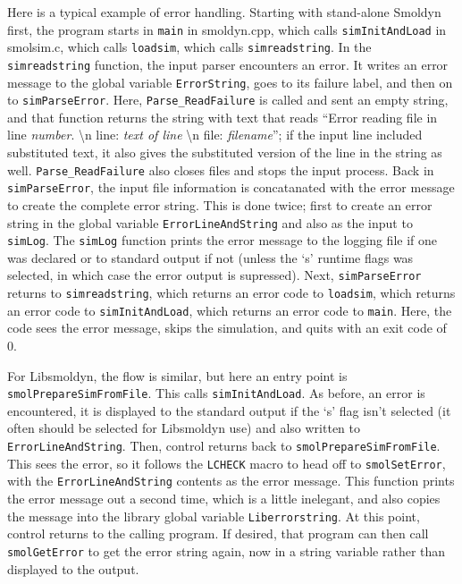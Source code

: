 \documentclass {scrbook}
\newcommand {\ttt} {\texttt}
\begin{document}
Here is a typical example of error handling. Starting with stand-alone Smoldyn first, the program starts in \ttt{main} in smoldyn.cpp, which calls \ttt{simInitAndLoad} in smolsim.c, which calls \ttt{loadsim}, which calls \ttt{simreadstring}. In the \ttt{simreadstring} function, the input parser encounters an error. It writes an error message to the global variable \ttt{ErrorString}, goes to its failure label, and then on to \ttt{simParseError}. Here, \ttt{Parse\_ReadFailure} is called and sent an empty string, and that function returns the string with text that reads ``Error reading file in line \textit{number}. \textbackslash n line: \textit{text of line} \textbackslash n file: \textit{filename}''; if the input line included substituted text, it also gives the substituted version of the line in the string as well. \ttt{Parse\_ReadFailure} also closes files and stops the input process. Back in \ttt{simParseError}, the input file information is concatanated with the error message to create the complete error string. This is done twice; first to create an error string in the global variable \ttt{ErrorLineAndString} and also as the input to \ttt{simLog}. The \ttt{simLog} function prints the error message to the logging file if one was declared or to standard output if not (unless the `s' runtime flags was selected, in which case the error output is supressed). Next, \ttt{simParseError} returns to \ttt{simreadstring}, which returns an error code to \ttt{loadsim}, which returns an error code to \ttt{simInitAndLoad}, which returns an error code to \ttt{main}. Here, the code sees the error message, skips the simulation, and quits with an exit code of 0.

For Libsmoldyn, the flow is similar, but here an entry point is \ttt{smolPrepareSimFromFile}. This calls \ttt{simInitAndLoad}. As before, an error is encountered, it is displayed to the standard output if the `s' flag isn't selected (it often should be selected for Libsmoldyn use) and also written to \ttt{ErrorLineAndString}. Then, control returns back to \ttt{smolPrepareSimFromFile}. This sees the error, so it follows the \ttt{LCHECK} macro to head off to \ttt{smolSetError}, with the \ttt{ErrorLineAndString} contents as the error message. This function prints the error message out a second time, which is a little inelegant, and also copies the message into the library global variable \ttt{Liberrorstring}. At this point, control returns to the calling program. If desired, that program can then call \ttt{smolGetError} to get the error string again, now in a string variable rather than displayed to the output.
\end{document}
